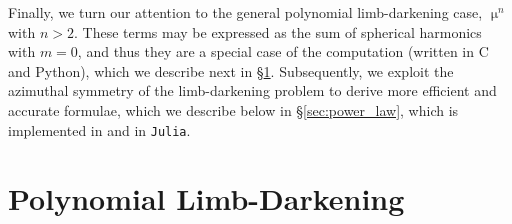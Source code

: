\documentclass[modern]{aastex61}
\begin{document}
Finally, we turn our attention to the general polynomial limb-darkening case,
$\upmu^n$ with $n > 2$.  These terms may be expressed as the sum of
spherical harmonics with $m=0$, and thus they are a special case of the \starry
computation (written in C and Python), which we describe next in \S \ref{sec:poly}.
Subsequently, we exploit the azimuthal symmetry of the limb-darkening problem to 
derive more efficient and accurate formulae, which we describe below in \S \ref{sec:power_law},
which is implemented in \starry and in \texttt{Julia}.


%
\section{Polynomial Limb-Darkening}
\label{sec:poly}
\end{document}
